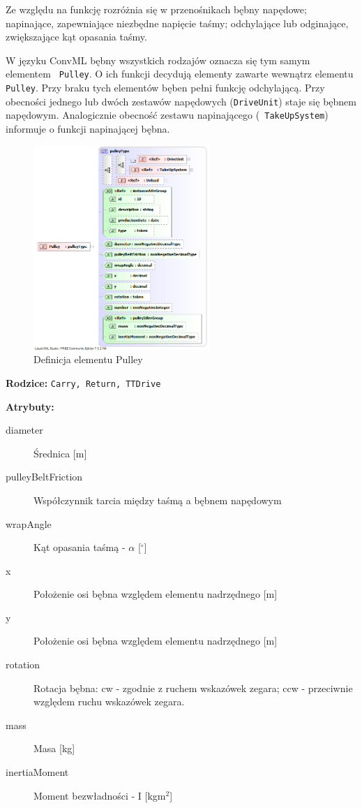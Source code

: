 \documentclass[12pt,a4paper]{article}
\begin{document}
Ze względu na funkcję rozróżnia się w przenośnikach bębny napędowe; napinające,
zapewniające niezbędne napięcie taśmy; odchylające lub odginające, zwiększające
kąt opasania taśmy.

W języku ConvML bębny wszystkich rodzajów oznacza się tym samym elementem {\tt
  Pulley}.  O ich funkcji decydują elementy zawarte wewnątrz elementu {\tt
  Pulley}. Przy braku tych elementów bęben pełni funkcję odchylającą.  Przy
obecności jednego lub dwóch zestawów napędowych ({\tt DriveUnit}) staje się
bębnem napędowym.  Analogicznie obecność zestawu napinającego ({\tt
  TakeUpSystem}) informuje o funkcji napinającej bębna.

\begin{figure}[H]
  \centering
  \includegraphics[width=0.6\textwidth]{png/liquid/Pulley}
  \caption{Definicja elementu Pulley}
  \label{fig:pulley-xsd}
\end{figure}

\noindent\textbf{Rodzice:} \texttt{Carry, Return, TTDrive}

\noindent\textbf{Atrybuty:}
\begin{description}
\item[diameter] Średnica [m]
\item[pulleyBeltFriction] Współczynnik tarcia między taśmą a bębnem napędowym
\item[wrapAngle] Kąt opasania taśmą - $\alpha$ [$^\circ$]
\item[x] Położenie osi bębna względem elementu nadrzędnego [m]
\item[y] Położenie osi bębna względem elementu nadrzędnego [m]
\item[rotation] Rotacja bębna: cw - zgodnie z ruchem wskazówek zegara;
	ccw - przeciwnie względem ruchu wskazówek zegara.
\item[mass] Masa [kg]
\item[inertiaMoment] Moment bezwładności - I [kgm$^2$]
\end{description}
\end{document}
